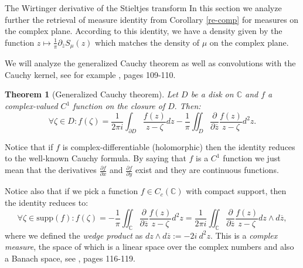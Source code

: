 \documentclass[11pt, a4paper, oneside]{book}
\numberwithin{equation}{chapter}
\newtheorem{thm}{Theorem}[section]
\begin{document}
\begin{section}{The Wirtinger derivative of the Stieltjes transform} \label{wirtinger}
In this section we analyze further the retrieval of measure identity from Corollary \ref{re-comp} for measures on the complex plane. According to this identity, we have a density given by the function $z \mapsto \frac{1}{\pi} \partial_{\overline{z}} S_\mu(z)$ which matches the density of $\mu$ on the complex plane.

We will analyze the generalized Cauchy theorem as well as convolutions with the Cauchy kernel, see for example \cite{lebl2019tasty}, pages 109-110.
%
\begin{thm}[Generalized Cauchy theorem]
Let $D$ be a disk on $\mathbb{C}$ and $f$ a complex-valued $C^1$ function on the closure of $D.$ Then:
\[
\forall \zeta \in D: f(\zeta) = \frac{1}{2\pi i} \int_{\partial D} \frac{f(z)}{z - \zeta}dz - \frac{1}{\pi} \iint_D \frac{\partial }{\partial \overline{z}} \frac{f(z)}{z - \zeta} d^2 z .
\]
\end{thm}
%
Notice that if $f$ is complex-differentiable (holomorphic) then the identity reduces to the well-known Cauchy formula. By saying that $f$ is a $C^1$ function we just mean that the derivatives $\frac{\partial f}{\partial x }$ and $\frac{\partial f}{\partial y }$ exist and they are continuous functions.

Notice also that if we pick a function $f \in C_c(\mathbb{C})$ with compact support, then the identity reduces to:
%
\[
\forall \zeta \in \mathrm{supp}(f): f(\zeta) = - \frac{1}{\pi} \iint_{\mathbb{C}} \frac{\partial }{\partial \overline{z}} \frac{f(z)}{z - \zeta} d^2 z = \frac{1}{2\pi i} \iint_{\mathbb{C}} \frac{\partial }{\partial \overline{z}} \frac{f(z)}{z - \zeta} dz \wedge d\overline{z},
\]
where we defined the \textit{wedge product} as $dz \wedge d\overline{z} := -2i \ d^2 z .$ This is a \textit{complex measure}, the space of which is a linear space over the complex numbers and also a Banach space, see \cite{rudin86real}, pages 116-119.


\end{section}
\end{document}
